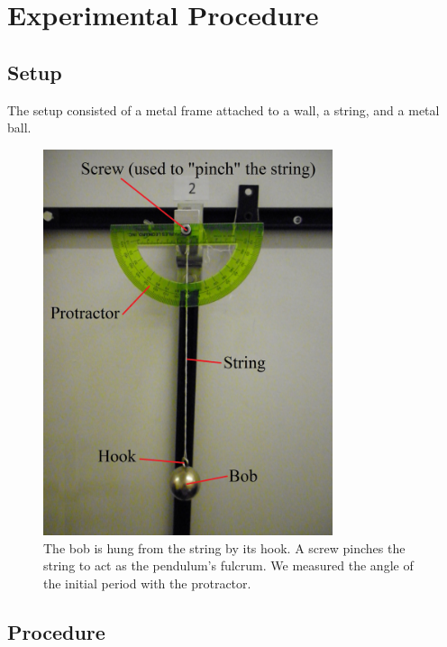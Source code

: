 \documentclass[iop]{emulateapj}
\begin{document}
\section{Experimental Procedure}
\label{sec:procedure}


\subsection{Setup}


The setup consisted of a metal frame attached to a wall, a string, and a metal 
ball.




\begin{figure}[H]
\centering
\includegraphics[width=85mm]{../../Images/Pendulum.JPG}
\caption{The bob is hung from the string by its hook. A screw pinches the string to act as
the pendulum's fulcrum. We measured the angle of the initial period with the 
protractor.}
\label{Pendulum}
\end{figure}




\subsection{Procedure}
\end{document}
